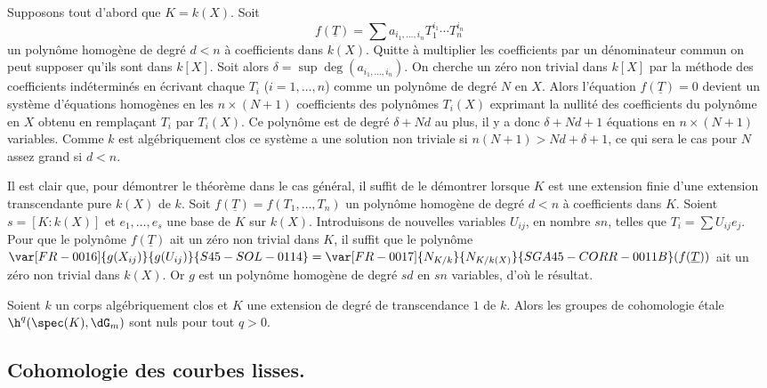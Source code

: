 Supposons tout d'abord que $K=k(X)$. Soit 
\[
  f(\underline{T}) = \sum a_{i_1,\dotsc,i_n} T_1^{i_1} \dotsm T_n^{i_n}
\]
un polynôme homogène de degré $d<n$ à coefficients dans $k(X)$. Quitte 
à multiplier les coefficients par un dénominateur commun on peut supposer 
qu'ils sont dans $k[X]$. Soit alors $\delta=\sup\deg(a_{i_1,\dotsc,i_n})$. On 
cherche un zéro non trivial dans $k[X]$ par la méthode des coefficients 
indéterminés en écrivant chaque $T_i$ ($i=1,\dotsc,n$) comme un 
polynôme de degré $N$ en $X$. Alors l'équation $f(\underline{T})=0$ devient un système 
d'équations homogènes en les $n\times (N+1)$ coefficients des polynômes 
$T_i(X)$ exprimant la nullité des coefficients du polynôme en $X$ obtenu en 
remplaçant $T_i$ par $T_i(X)$. Ce polynôme est de degré $\delta+N d$ au plus, 
il y a donc $\delta+N d+1$ équations en $n\times (N+1)$ variables. Comme $k$ 
est algébriquement clos ce système a une solution non triviale si 
$n(N+1)>N d+\delta+1$, ce qui sera le cas pour $N$ assez grand si $d<n$. 

Il est clair que, pour démontrer le théorème dans le cas général, il 
suffit de le démontrer lorsque $K$ est une extension finie d'une extension 
transcendante pure $k(X)$ de $k$. Soit $f(\underline{T})=f(T_1,\dotsc,T_n)$ un 
polynôme homogène de degré $d<n$ à coefficients dans $K$. Soient 
$s=[K:k(X)]$ et $e_1,\dotsc,e_s$ une base de $K$ sur $k(X)$. Introduisons de 
nouvelles variables $U_{i j}$, en nombre $s n$, telles que 
$T_i=\sum U_{i j}e_j$. Pour que le polynôme $f(\underline{T})$ ait un zéro 
non trivial dans $K$, il suffit que le polynôme 
$\var[FR-0016]{g(X_{i j})}{g(U_{i j})}{S45-SOL-0114} = \var[FR-0017]{N_{K/k}}{N_{K/k(X)}}{SGA45-CORR-0011B}(f(\underline{T}))$ ait un zéro non trivial dans $k(X)$. 
Or $g$ est un polynôme homogène de degré $s d$ en $s n$ variables, d'où le 
résultat. 





\begin{corollarydotdash}\label{I:3-2-4}
  Soient $k$ un corps algébriquement clos et $K$ une extension de degré 
de transcendance $1$ de $k$. Alors les groupes de cohomologie étale 
$\h^q(\spec(K),\dG_m)$ sont nuls pour tout $q>0$. 
\end{corollarydotdash}










\subsection{Cohomologie des courbes lisses.}\label{I:3-3}

